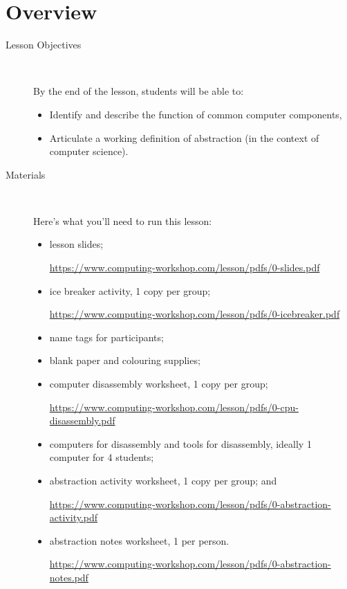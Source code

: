 \documentclass[11pt]{article}
\newcommand{\cwurl}{https://www.computing-workshop.com/lesson/pdfs/}
\begin{document}
\section*{Overview}
\begin{description}
  \item [Lesson Objectives] 
    ~

   By the end of the lesson, students will be able to:
  \begin{itemize}

    \item Identify and describe the function of common computer components,

    \item Articulate a working definition of abstraction (in the context of
      computer science).

  \end{itemize}
  \item [Materials]~

Here's what you'll need to run this lesson:
  \begin{itemize}
    \item
      lesson slides;

      \url{\cwurl 0-slides.pdf}

    \item
      ice breaker activity, 1 copy per group; 

      \url{\cwurl 0-icebreaker.pdf}

    \item
      name tags for participants;

    \item
      blank paper and colouring supplies;

    \item
      computer disassembly worksheet, 1 copy per group;

      \url{\cwurl 0-cpu-disassembly.pdf}

    \item
      computers for disassembly and tools for disassembly, ideally 1
      computer for 4 students;

    \item
      abstraction activity worksheet, 1 copy per group; and

      \url{\cwurl 0-abstraction-activity.pdf}

    \item
      abstraction notes worksheet, 1 per person.

      \url{\cwurl 0-abstraction-notes.pdf}

  \end{itemize}
\end{description}
\end{document}
